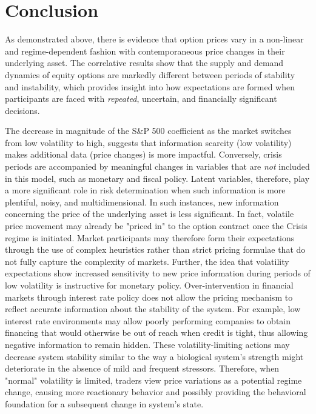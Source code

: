 \documentclass[11pt,a4paper,oldfontcommands]{memoir}
\begin{document}
{\section{Conclusion}

As demonstrated above, there is evidence that option prices vary in a non-linear and regime-dependent fashion with contemporaneous price changes in their underlying asset. The correlative results show that the supply and demand dynamics of equity options are markedly different between periods of stability and instability, which provides insight into how expectations are formed when participants are faced with \textit{repeated}, uncertain, and financially significant decisions. 


The decrease in magnitude of the S\&P 500 coefficient as the market switches from low volatility to high, suggests that information scarcity (low volatility) makes additional data (price changes) is more impactful. Conversely, crisis periods are accompanied by meaningful changes in variables that are \textit{not} included in this model, such as monetary and fiscal policy. Latent variables, therefore, play a more significant role in risk determination when such information is more plentiful, noisy, and multidimensional. In such instances, new information concerning the price of the underlying asset is less significant. In fact, volatile price movement may already be "priced in" to the option contract once the Crisis regime is initiated. Market participants may therefore form their expectations through the use of complex heuristics rather than strict pricing formulae that do not fully capture the complexity of markets. Further, the idea that volatility expectations show increased sensitivity to new price information during periods of low volatility is instructive for monetary policy. Over-intervention in financial markets through interest rate policy does not allow the pricing mechanism to reflect accurate information about the stability of the system. For example, low interest rate environments may allow poorly performing companies to obtain financing that would otherwise be out of reach when credit is tight, thus allowing negative information to remain hidden. These volatility-limiting actions may decrease system stability similar to the way a biological system's strength might deteriorate in the absence of mild and frequent stressors. Therefore, when "normal" volatility is limited, traders view price variations as a potential regime change, causing more reactionary behavior and possibly providing the behavioral foundation for a subsequent change in system's state.

}
\end{document}

